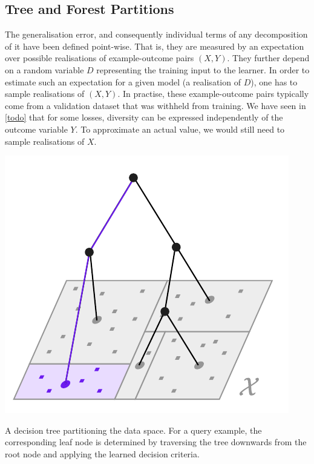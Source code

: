 \documentclass[../main.tex]{subfiles}
\begin{document}
\subsection{Tree and Forest Partitions}
\label{sec:tree-and-forest-partitions}

The generalisation error, and consequently individual terms of any decomposition of it have been defined point-wise. That is, they are measured by an expectation over possible realisations of example-outcome pairs $(X,Y)$. They further depend on a random variable $D$ representing the training input to the learner. In order to estimate such an expectation for a given model (a realisation of $D$), one has to sample realisations of $(X,Y)$. In practise, these example-outcome pairs typically come from a validation dataset that was withheld from training.
We have seen in \ref{todo} that for some losses, diversity can be expressed independently of the outcome variable $Y$. 
To approximate an actual value, we would still need to sample realisations of $X$.

\begin{marginfigure}
    \includegraphics[width=\textwidth]{figma-illustrations/tree-partition.pdf}
    \label{fig:tree-partition}
    \caption{A decision tree partitioning the data space. For a query example, the corresponding leaf node is determined by traversing the tree downwards from the root node and applying the learned decision criteria.}
\end{marginfigure}
\end{document}
